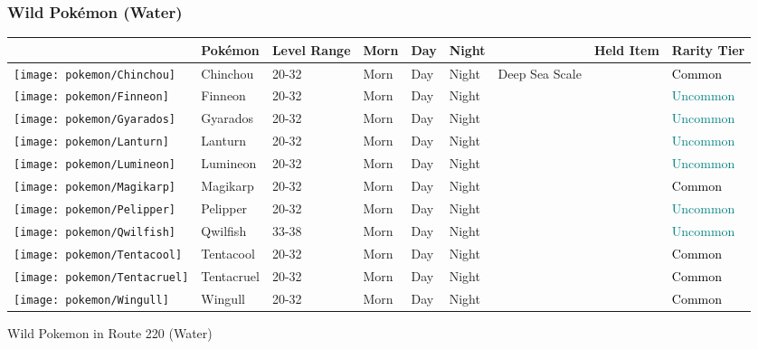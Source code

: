 \subsubsection{Wild Pokémon (Water)}%
\label{ssubsec:WildPokmon(Water)}%
\begin{longtable}{||l l l l l l l l l||}%
\hline%
&Pokémon&Level Range&Morn&Day&Night&&Held Item&Rarity Tier\\%
\hline%
\endhead%
\hline%
\texttt{[image: pokemon/Chinchou]}&Chinchou&20{-}32&Morn&Day&Night&Deep Sea Scale&&\textcolor{black}{%
Common%
}\\%
\hline%
\texttt{[image: pokemon/Finneon]}&Finneon&20{-}32&Morn&Day&Night&&&\textcolor{teal}{%
Uncommon%
}\\%
\hline%
\texttt{[image: pokemon/Gyarados]}&Gyarados&20{-}32&Morn&Day&Night&&&\textcolor{teal}{%
Uncommon%
}\\%
\hline%
\texttt{[image: pokemon/Lanturn]}&Lanturn&20{-}32&Morn&Day&Night&&&\textcolor{teal}{%
Uncommon%
}\\%
\hline%
\texttt{[image: pokemon/Lumineon]}&Lumineon&20{-}32&Morn&Day&Night&&&\textcolor{teal}{%
Uncommon%
}\\%
\hline%
\texttt{[image: pokemon/Magikarp]}&Magikarp&20{-}32&Morn&Day&Night&&&\textcolor{black}{%
Common%
}\\%
\hline%
\texttt{[image: pokemon/Pelipper]}&Pelipper&20{-}32&Morn&Day&Night&&&\textcolor{teal}{%
Uncommon%
}\\%
\hline%
\texttt{[image: pokemon/Qwilfish]}&Qwilfish&33{-}38&Morn&Day&Night&&&\textcolor{teal}{%
Uncommon%
}\\%
\hline%
\texttt{[image: pokemon/Tentacool]}&Tentacool&20{-}32&Morn&Day&Night&&&\textcolor{black}{%
Common%
}\\%
\hline%
\texttt{[image: pokemon/Tentacruel]}&Tentacruel&20{-}32&Morn&Day&Night&&&\textcolor{black}{%
Common%
}\\%
\hline%
\texttt{[image: pokemon/Wingull]}&Wingull&20{-}32&Morn&Day&Night&&&\textcolor{black}{%
Common%
}\\%
\hline%
\end{longtable}%
\caption{Wild Pokemon in Route 220 (Water)}